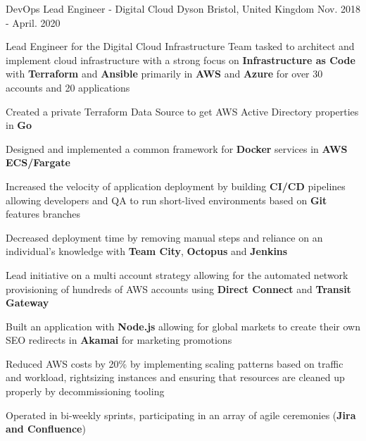\begin{cventries}
  \cventry
    {DevOps Lead Engineer - Digital Cloud} %
    {Dyson} %
    {Bristol, United Kingdom} %
    {Nov. 2018 - April. 2020} %
    {
      \begin{cvitems} %
        \item {Lead Engineer for the Digital Cloud Infrastructure Team tasked to architect and implement cloud infrastructure with a strong focus on \textbf{Infrastructure as Code} with \textbf{Terraform} and \textbf{Ansible} primarily in \textbf{AWS} and \textbf{Azure} for over 30 accounts and 20 applications}
        \item {Created a private Terraform Data Source to get AWS Active Directory properties in \textbf{Go}}
        \item {Designed and implemented a common framework for \textbf{Docker} services in \textbf{AWS ECS/Fargate}}
        \item {Increased the velocity of application deployment by building \textbf{CI/CD} pipelines allowing developers and QA to run short-lived environments based on \textbf{Git} features branches}
        \item {Decreased deployment time by removing manual steps and reliance on an individual’s knowledge with \textbf{Team City}, \textbf{Octopus} and \textbf{Jenkins}}
        \item {Lead initiative on a multi account strategy allowing for the automated network provisioning of hundreds of AWS accounts using \textbf{Direct Connect} and \textbf{Transit Gateway}}
        \item {Built an application with \textbf{Node.js} allowing for global markets to create their own SEO redirects in \textbf{Akamai} for marketing promotions}
        \item {Reduced AWS costs by 20\% by implementing scaling patterns based on traffic and workload, rightsizing instances and ensuring that resources are cleaned up properly by decommissioning tooling}
        \item {Operated in bi-weekly sprints, participating in an array of agile ceremonies (\textbf{Jira and Confluence})}
      \end{cvitems}
    }


\end{cventries}
